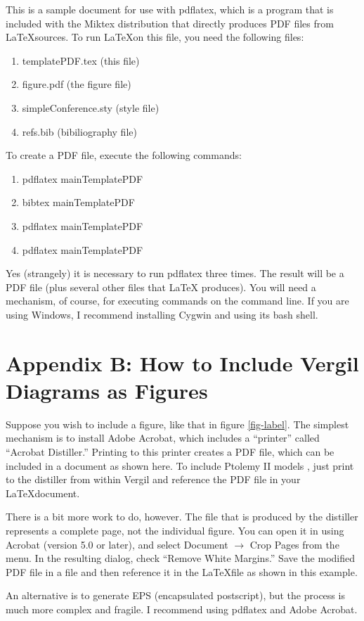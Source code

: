 \documentclass[10pt,twocolumn]{article}
\begin{document}
This is a sample document for use with pdflatex, which is
a program that is included with the Miktex distribution
that directly produces PDF files from \LaTeX sources.
To run \LaTeX on this file, you need the following files:
\begin{enumerate}
\item templatePDF.tex (this file)
\item figure.pdf (the figure file)
\item simpleConference.sty (style file)
\item refs.bib (bibiliography file)
\end{enumerate}
\noindent
To create a PDF file, execute the following commands:
\begin{enumerate}
\item pdflatex mainTemplatePDF
\item bibtex mainTemplatePDF
\item pdflatex mainTemplatePDF
\item pdflatex mainTemplatePDF
\end{enumerate}
\noindent
Yes (strangely) it is necessary to run pdflatex three times.
The result will be a PDF file (plus several other files that \LaTeX
produces).  You will need a mechanism, of course, for executing
commands on the command line. If you are using Windows, I recommend
installing Cygwin and using its bash shell.

\section{Appendix B: How to Include Vergil Diagrams as Figures}
\iffalse
\begin{figure}[!b]
  \begin{center}
    \texttt{[image: figure.pdf]}
  \end{center}

  \caption{\small Figure caption. To get a figure to span two
      columns, use the environment figure* rather than figure.}
  \label{fig-label}
\end{figure}
\fi

Suppose you wish to include a figure, like that in figure \ref{fig-label}.
The simplest mechanism is to install Adobe Acrobat, which includes
a ``printer'' called ``Acrobat Distiller.'' Printing to this printer
creates a PDF file, which can be included in a document as shown
here.  To include Ptolemy II models \cite{PtolemyVol1:04},
just print to the distiller from within Vergil and reference
the PDF file in your \LaTeX document.

There is a bit more work to do, however.
The file that is produced by the distiller represents
a complete page, not the individual figure.
You can open it in using Acrobat (version 5.0 or later),
and select Document $\rightarrow$ Crop Pages from the menu.
In the resulting dialog, check ``Remove White Margins.''
Save the modified PDF file in a file and then reference
it in the \LaTeX file as shown in this example.

An alternative is to generate EPS (encapsulated postscript),
but the process is much more complex and fragile.
I recommend using pdflatex and Adobe Acrobat.



\end{document}
